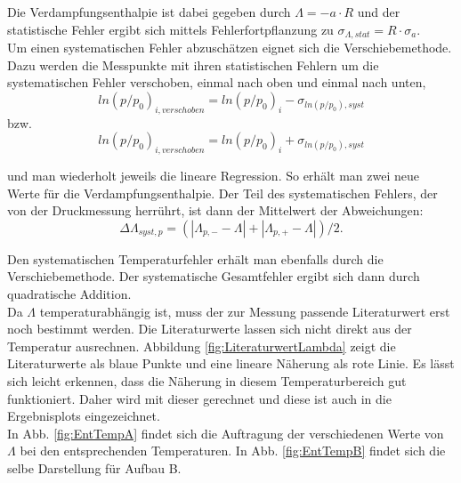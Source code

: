 \documentclass[12pt,a4paper]{article}
\begin{document}
Die Verdampfungsenthalpie ist dabei gegeben durch $\Lambda=-a \cdot R$ und der statistische Fehler ergibt sich mittels Fehlerfortpflanzung zu $\sigma_{\Lambda, stat}=R \cdot \sigma_a$.\\
Um einen systematischen Fehler abzuschätzen eignet sich die Verschiebemethode. Dazu werden die Messpunkte mit ihren statistischen Fehlern um die systematischen Fehler verschoben, einmal nach oben und einmal nach unten,   \\

\begin{equation}
	ln(p/p_0)_{i, verschoben} = ln(p/p_0)_{i} - \sigma _{ln(p/p_0), syst}
\end{equation}
bzw.
\begin{equation}
	ln(p/p_0)_{i, verschoben} = ln(p/p_0)_{i} + \sigma _{ln(p/p_0), syst}
\end{equation}

und man wiederholt jeweils die lineare Regression. So erhält man zwei neue Werte für die Verdampfungsenthalpie. Der Teil des systematischen Fehlers, der von der Druckmessung herrührt, ist dann der Mittelwert der Abweichungen:
\begin{equation}
	\Delta \Lambda _{syst,p} = ( |\Lambda_{p,-}-\Lambda| + |\Lambda_{p,+} - \Lambda|)/2 .
\end{equation}

Den systematischen Temperaturfehler erhält man ebenfalls durch die Verschiebemethode. Der systematische Gesamtfehler ergibt sich dann durch quadratische Addition.\\

Da $\Lambda$ temperaturabhängig ist, muss der zur Messung passende Literaturwert erst noch bestimmt werden. Die Literaturwerte lassen sich nicht direkt aus der Temperatur ausrechnen. Abbildung \ref{fig:LiteraturwertLambda} zeigt die Literaturwerte als blaue Punkte und eine lineare Näherung als rote Linie. Es lässt sich leicht erkennen, dass die Näherung in diesem Temperaturbereich gut funktioniert. Daher wird mit dieser gerechnet und diese ist auch in die Ergebnisplots eingezeichnet. \\
In Abb. \ref{fig:EntTempA} findet sich die Auftragung der verschiedenen Werte von $\Lambda$ bei den entsprechenden Temperaturen. In Abb. \ref{fig:EntTempB} findet sich die selbe Darstellung für Aufbau B.\\
\end{document}

